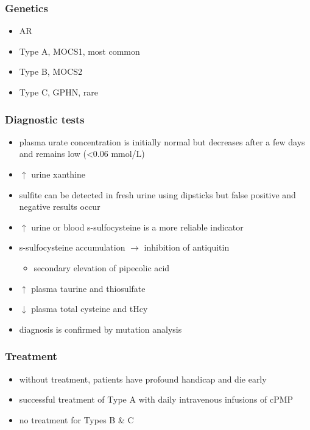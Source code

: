 \documentclass{scrartcl}
\begin{document}
\subsubsection{Genetics}
\label{sec:org205d6cd}
\begin{itemize}
\item AR
\item Type A, MOCS1, most common
\item Type B, MOCS2
\item Type C, GPHN, rare
\end{itemize}

\subsubsection{Diagnostic tests}
\label{sec:org3dc73a4}
\begin{itemize}
\item plasma urate concentration is initially normal but decreases after a
few days and remains low (<0.06 mmol/L)
\item \(\uparrow\) urine xanthine
\item sulfite can be detected in fresh urine using dipsticks but false
positive and negative results occur
\item \(\uparrow\) urine or blood s-sulfocysteine is a more reliable indicator
\item s-sulfocysteine accumulation \(\to\) inhibition of antiquitin
\begin{itemize}
\item secondary elevation of pipecolic acid
\end{itemize}
\item \(\uparrow\) plasma taurine and thiosulfate
\item \(\downarrow\) plasma total cysteine and tHcy
\item diagnosis is confirmed by mutation analysis
\end{itemize}

\subsubsection{Treatment}
\label{sec:org534812e}
\begin{itemize}
\item without treatment, patients have profound handicap and die early
\item successful treatment of Type A with daily intravenous infusions of
cPMP
\item no treatment for Types B \& C
\end{itemize}
\end{document}
